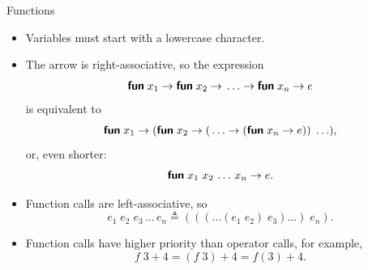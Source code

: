 %
\begin{frame}{Functions}

  \begin{itemize}

    \item Variables must start with a lowercase character.

    \item The arrow is right-associative, so the expression
      \begin{equation*}
        \textsf{\textbf{fun}} \; x_1 \rightarrow \textsf{\textbf{fun}} \; x_2
        \rightarrow \, \ldots
        \rightarrow \textsf{\textbf{fun}} \; x_n \rightarrow e
      \end{equation*}
      is equivalent to
      \begin{equation*}
        \textsf{\textbf{fun}} \; x_1 \rightarrow (\textsf{\textbf{fun}} \; x_2
      \rightarrow (\,\ldots \rightarrow (\textsf{\textbf{fun}} \; x_n \rightarrow e)) \;
      \ldots),
      \end{equation*}
      or, even shorter:
      \begin{equation*}
        \textsf{\textbf{fun}} \; x_1 \; x_2 \, \ldots \, x_n \rightarrow e.
      \end{equation*}

    \item Function calls are left\hyp{}associative, so
      \begin{equation*}
        e_1 \; e_2 \; e_3 \,\ldots\, e_n \triangleq (((\ldots
        (e_1 \; e_2) \; e_3) \ldots) \; e_n).
      \end{equation*}

    \item Function calls have higher priority than operator calls, for
      example,
      \begin{equation*}
        f \; 3 + 4 = (f \; 3) + 4 = f(3) + 4.
      \end{equation*}

  \end{itemize}

\end{frame}

